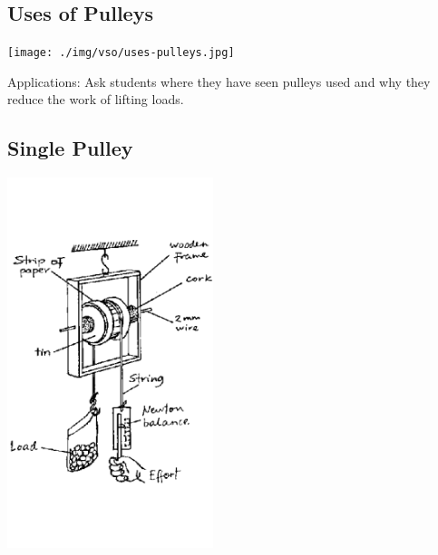 \begin{multicols}{2}
\subsection{Uses of Pulleys}

\begin{center}
\texttt{[image: ./img/vso/uses-pulleys.jpg]}
\end{center}

\begin{description*}
\item[Applications:]{Ask students where they have
seen pulleys used and why they
reduce the work of lifting loads.}
\end{description*}

\subsection{Single Pulley}

\begin{center}
\includegraphics[width=0.45\textwidth]{./img/source/single-pulley.png}
\end{center}


\end{multicols}

